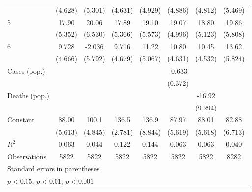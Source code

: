 \documentclass{article}
\begin{document}
{\begin{longtable}{l*{7}{c}}
                &  (4.628)         &  (5.301)         &  (4.631)         &  (4.929)         &  (4.886)         &  (4.812)         &  (5.469)         \\
5               &    17.90\sym{**} &    20.06\sym{**} &    17.89\sym{**} &    19.10\sym{**} &    19.07\sym{***}&    18.80\sym{***}&    19.86\sym{**} \\
                &  (5.352)         &  (6.530)         &  (5.366)         &  (5.573)         &  (4.996)         &  (5.123)         &  (5.808)         \\
6               &    9.728\sym{*}  &   -2.036         &    9.716\sym{*}  &    11.22\sym{*}  &    10.80\sym{*}  &    10.45\sym{*}  &    13.62\sym{*}  \\
                &  (4.666)         &  (5.792)         &  (4.679)         &  (5.067)         &  (4.631)         &  (4.532)         &  (5.824)         \\
Cases (pop.)    &                  &                  &                  &                  &   -0.633         &                  &                  \\
                &                  &                  &                  &                  &  (0.372)         &                  &                  \\
Deaths (pop.)   &                  &                  &                  &                  &                  &   -16.92         &                  \\
                &                  &                  &                  &                  &                  &  (9.294)         &                  \\
Constant        &    88.00\sym{***}&    100.1\sym{***}&    136.5\sym{***}&    136.9\sym{***}&    87.97\sym{***}&    88.01\sym{***}&    82.88\sym{***}\\
                &  (5.613)         &  (4.845)         &  (2.781)         &  (8.844)         &  (5.619)         &  (5.618)         &  (6.713)         \\
\hline
\(R^{2}\)       &    0.063         &    0.044         &    0.122         &    0.144         &    0.063         &    0.063         &    0.040         \\
Observations    &     5822         &     5822         &     5822         &     5822         &     5822         &     5822         &     8282         \\
\hline\hline
\multicolumn{8}{l}{\footnotesize Standard errors in parentheses}\\
\multicolumn{8}{l}{\footnotesize \sym{*} \(p<0.05\), \sym{**} \(p<0.01\), \sym{***} \(p<0.001\)}\\
\end{longtable}
}
\end{document}
